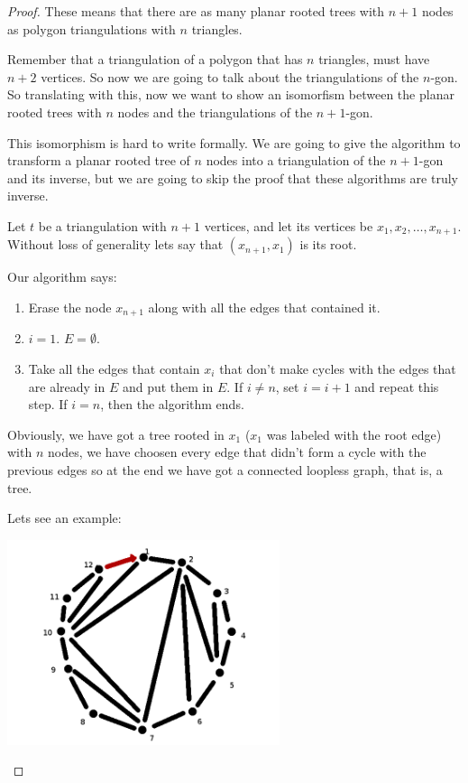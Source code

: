 \begin{proof}
    These means that there are as many planar rooted trees with $n + 1$ nodes as polygon triangulations with $n$ triangles.\pn
    
    Remember that a triangulation of a polygon that has $n$ triangles, must have $n + 2$ vertices. So now we are going to talk about
    the triangulations of the $n$-gon. So translating with this, now we want to show an isomorfism between the planar rooted trees with $n$ nodes
    and the triangulations of the $n + 1$-gon.\pn
    
    This isomorphism is hard to write formally. We are going to give the algorithm to transform a planar rooted tree of $n$ nodes into a triangulation
    of the $n + 1$-gon and its inverse, but we are going to skip the proof that these algorithms are truly inverse.\pn
    
    Let $t$ be a triangulation with $n+1$ vertices, and let its vertices be $x_1, x_2, \dots, x_{n+1}$. Without loss of generality lets say that
    $(x_{n+1}, x_1)$ is its root.\pn
    
    Our algorithm says:
    
    \begin{enumerate}
        \item 
            Erase the node $x_{n+1}$ along with all the edges that contained it.
        \item
            $i = 1.$\pn
            $E = \emptyset.$
        
        \item
            Take all the edges that contain $x_i$ that don't make cycles with the edges that are already in $E$ and
            put them in $E$. If $i \neq n$, set $i = i + 1$ and repeat this step. If $i = n$, then the algorithm ends.
    \end{enumerate}
    
    Obviously, we have got a tree rooted in $x_1$ ($x_1$ was labeled with the root edge) with $n$ nodes, we have choosen every edge that 
    didn't form a cycle with the previous edges so at the end we have got a connected loopless graph, that is, a tree.\pn
    
    Lets see an example:\pn
    \begin{center}
        \includegraphics[width=8cm]{Homework1/Problem4/TriangulationToPlanarRootedTree1.png}
    \end{center}
    

\end{proof}
